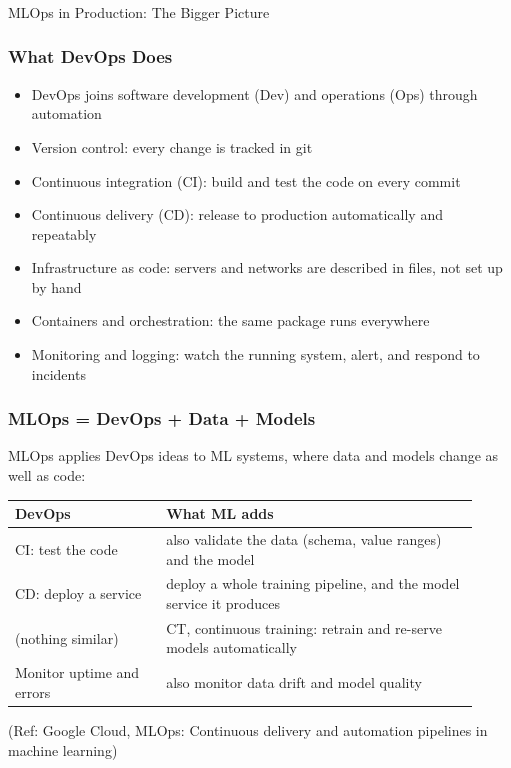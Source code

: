 \begin{frame}[fragile]\frametitle{}
\begin{center}
{\Large MLOps in Production: The Bigger Picture}
\end{center}
\end{frame}

\begin{frame}[fragile]\frametitle{What DevOps Does}
\begin{itemize}
\item DevOps joins software development (Dev) and operations (Ops) through automation
\item Version control: every change is tracked in git
\item Continuous integration (CI): build and test the code on every commit
\item Continuous delivery (CD): release to production automatically and repeatably
\item Infrastructure as code: servers and networks are described in files, not set up by hand
\item Containers and orchestration: the same package runs everywhere
\item Monitoring and logging: watch the running system, alert, and respond to incidents
\end{itemize}
\end{frame}

\begin{frame}[fragile]\frametitle{MLOps = DevOps + Data + Models}
MLOps applies DevOps ideas to ML systems, where data and models change as well as code:
\begin{center}
\small\renewcommand{\arraystretch}{1.35}
\begin{tabular}{>{\raggedright\arraybackslash}p{0.3\linewidth}>{\raggedright\arraybackslash}p{0.62\linewidth}}
\hline
\textbf{DevOps} & \textbf{What ML adds} \\
\hline
CI: test the code & also validate the data (schema, value ranges) and the model \\
CD: deploy a service & deploy a whole training pipeline, and the model service it produces \\
(nothing similar) & CT, continuous training: retrain and re-serve models automatically \\
Monitor uptime and errors & also monitor data drift and model quality \\
\hline
\end{tabular}
\end{center}
{\tiny (Ref: Google Cloud, MLOps: Continuous delivery and automation pipelines in machine learning)}
\end{frame}

